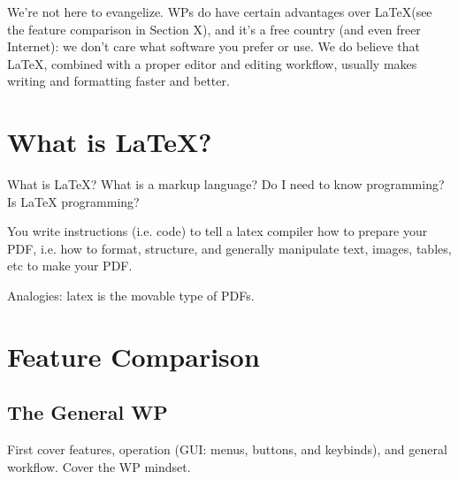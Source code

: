 \documentclass[12pt]{article}
\begin{document}
We're not here to evangelize. WPs do have certain advantages over \LaTeX (see the feature comparison in Section X), and it's a free country (and even freer Internet): we don't care what software you prefer or use. We do believe that \LaTeX, combined with a proper editor and editing workflow, usually makes writing and formatting faster and better.

\section{What is \LaTeX?}%
\label{what-is}

What is LaTeX? What is a markup language? Do I need to know programming? Is LaTeX programming?

You write instructions (i.e. code) to tell a latex compiler how to prepare your PDF, i.e. how to format, structure, and generally manipulate text, images, tables, etc to make your PDF.

Analogies: latex is the movable type of PDFs.

\section{Feature Comparison}%
\label{feat-comp}

\subsection{The General WP}%
\label{feat-comp.general-wp}

First cover features, operation (GUI: menus, buttons, and keybinds), and general workflow. Cover the WP mindset.
\end{document}
